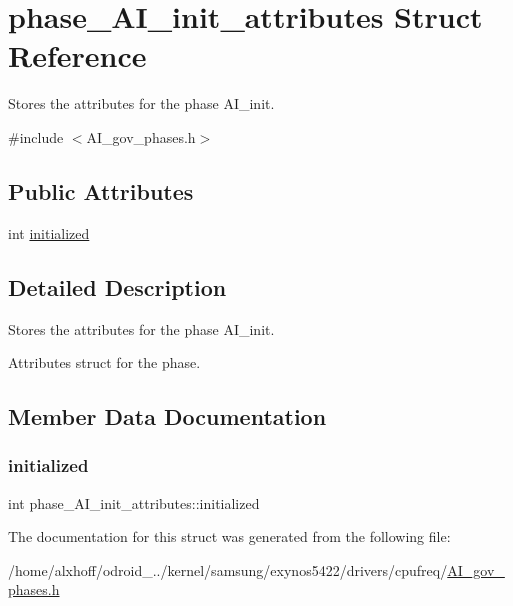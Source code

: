 \hypertarget{structphase__AI__init__attributes}{}\section{phase\+\_\+\+A\+I\+\_\+init\+\_\+attributes Struct Reference}
\label{structphase__AI__init__attributes}


Stores the attributes for the phase A\+I\+\_\+init.  




{\ttfamily \#include $<$A\+I\+\_\+gov\+\_\+phases.\+h$>$}

\subsection*{Public Attributes}
\begin{DoxyCompactItemize}
\item 
int \hyperlink{structphase__AI__init__attributes_ac3c8c0bd3f71afeedc3ed470cb1284f2}{initialized}
\end{DoxyCompactItemize}


\subsection{Detailed Description}
Stores the attributes for the phase A\+I\+\_\+init. 

Attributes struct for the phase. 

\subsection{Member Data Documentation}
\mbox{\label{structphase__AI__init__attributes_ac3c8c0bd3f71afeedc3ed470cb1284f2}} 
\subsubsection{\texorpdfstring{initialized}{initialized}}
{\footnotesize\ttfamily int phase\+\_\+\+A\+I\+\_\+init\+\_\+attributes\+::initialized}



The documentation for this struct was generated from the following file\+:\begin{DoxyCompactItemize}
\item 
/home/alxhoff/odroid\+\_../kernel/samsung/exynos5422/drivers/cpufreq/\hyperlink{AI__gov__phases_8h}{A\+I\+\_\+gov\+\_\+phases.\+h}\end{DoxyCompactItemize}
